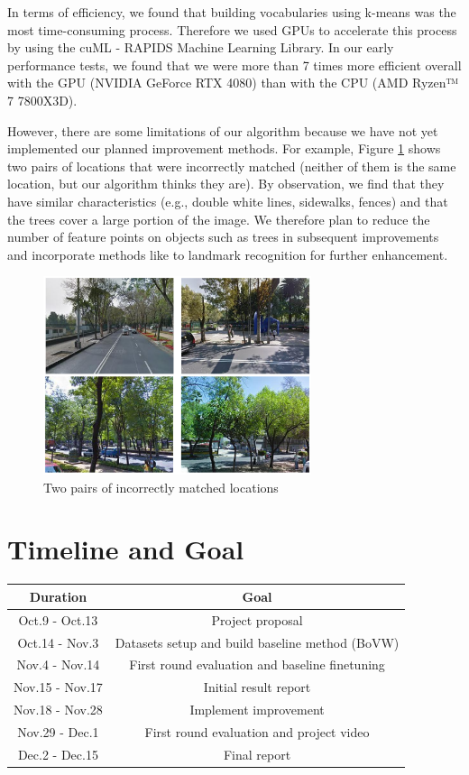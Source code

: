 \documentclass{article}
\begin{document}
In terms of efficiency, we found that building vocabularies using k-means was the most time-consuming process. Therefore we used GPUs to accelerate this process by using the cuML - RAPIDS Machine Learning Library. In our early performance tests, we found that we were more than 7 times more efficient overall with the GPU (NVIDIA GeForce RTX 4080) than with the CPU (AMD Ryzen™ 7 7800X3D).

However, there are some limitations of our algorithm because we have not yet implemented our planned improvement methods. For example, Figure \ref{fig:1} shows two pairs of locations that were incorrectly matched (neither of them is the same location, but our algorithm thinks they are). By observation, we find that they have similar characteristics (e.g., double white lines, sidewalks, fences) and that the trees cover a large portion of the image. We therefore plan to reduce the number of feature points on objects such as trees in subsequent improvements and incorporate methods like to landmark recognition for further enhancement.

\begin{figure}[H]
    \centering
    \includegraphics[width=0.7\textwidth]{figure1.png}
    \caption{Two pairs of incorrectly matched locations}
    \label{fig:1}
\end{figure}

\section{Timeline and Goal}

\begin{tabular}{|c|c|}
    \hline \textbf{Duration} & \textbf{Goal}\\
    \hline Oct.9 - Oct.13 & Project proposal\\
    \hline Oct.14 - Nov.3 & Datasets setup and build baseline method (BoVW)\\
    \hline Nov.4 - Nov.14 & First round evaluation and baseline finetuning\\
    \hline Nov.15 - Nov.17 & Initial result report\\
    \hline Nov.18 - Nov.28 & Implement improvement\\
    \hline Nov.29 - Dec.1 & First round evaluation and project video\\
    \hline Dec.2 - Dec.15 & Final report\\
    \hline
\end{tabular}



\end{document}
